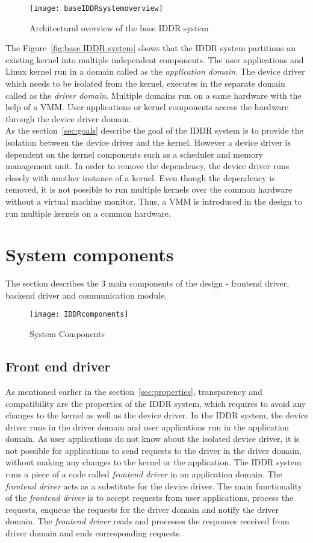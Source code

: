 \begin{figure}[!ht]
\centering
\texttt{[image: baseIDDRsystemoverview]}
\caption{Architectural overview of the base IDDR system}
\label{fig:base IDDR system overview}
\end{figure}
The Figure~\ref{fig:base IDDR system} shows that the IDDR system partitions an existing kernel into multiple independent components. The user applications and Linux kernel run in a domain called as the \textit{application domain}. The device driver which needs to be isolated from the kernel, executes in the separate domain called as the \textit{driver domain}. Multiple domains run on a same hardware with the help of a VMM. User applications or kernel components access the hardware through the device driver domain.
\\[3mm]
As the section~\ref{sec:goals} describe the goal of the IDDR system is to provide the isolation between the device driver and the kernel. However a device driver is dependent on the kernel components such as a scheduler and memory management unit. In order to remove the dependency, the device driver runs closely with another instance of a kernel. Even though the dependency is removed, it is not possible to run multiple kernels over the common hardware without a virtual machine monitor. Thus, a VMM is introduced in the design to run multiple kernels on a common hardware. 

\section{System components}\label{components}
The section describes the 3 main components of the design - frontend driver, backend driver and communication module.
\begin{figure}[!ht]
\centering
\texttt{[image: IDDRcomponents]}
\caption{System Components}
\label{fig:Design Evo1}
\end{figure}

\subsection{Front end driver}
\label{subsec:frontend}
As mentioned earlier in the section~\ref{sec:properties}, transparency and compatibility are the properties of the IDDR system, which requires to avoid any changes to the kernel as well as the device driver. In the IDDR system, the device driver runs in the driver domain and user applications run in the application domain. As user applications do not know about the isolated device driver, it is not possible for applications to send requests to the driver in the driver domain, without making any changes to the kernel or the application. The IDDR system runs a piece of a code called \textit{frontend driver} in an application domain. The \textit{frontend driver} acts as a substitute for the device driver. The main functionality of the \textit{frontend driver} is to accept requests from user applications, process the requests, enqueue the requests for the driver domain and notify the driver domain. The \textit{frontend driver} reads and processes the responses received from driver domain and ends corresponding requests.

